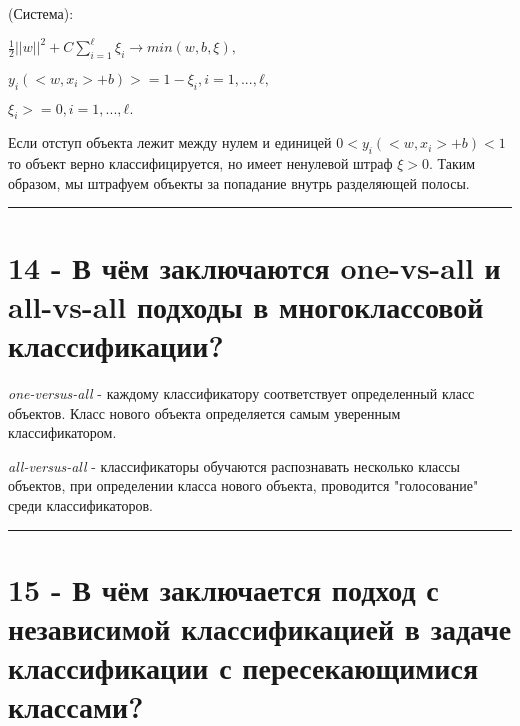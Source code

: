 \documentclass[11pt]{article}
\begin{document}
(Система):

\(\frac{1}{2}||w||^2 + C\sum_{i=1}^ℓξ_i → min(w,b,ξ) ,\)

\(y_i (<w, x_i> + b) >= 1 − ξ_i , i = 1,...,ℓ ,\)

\(ξ_i >= 0, i = 1,...,ℓ .\)

Если отступ объекта лежит между нулем и единицей
\(0 < y_i (<w, x_i> + b) < 1\) то объект верно классифицируется, но
имеет ненулевой штраф \(ξ > 0\). Таким образом, мы штрафуем объекты за
попадание внутрь разделяющей полосы.

    \begin{center}\rule{0.5\linewidth}{\linethickness}\end{center}

    \section{14 - В чём заключаются one-vs-all и all-vs-all подходы в
многоклассовой
классификации?}\label{ux432-ux447ux451ux43c-ux437ux430ux43aux43bux44eux447ux430ux44eux442ux441ux44f-one-vs-all-ux438-all-vs-all-ux43fux43eux434ux445ux43eux434ux44b-ux432-ux43cux43dux43eux433ux43eux43aux43bux430ux441ux441ux43eux432ux43eux439-ux43aux43bux430ux441ux441ux438ux444ux438ux43aux430ux446ux438ux438}

\emph{one-versus-all} - каждому классификатору соответствует
определенный класс объектов. Класс нового объекта определяется самым
уверенным классификатором.

\emph{all-versus-all} - классификаторы обучаются распознавать несколько
классы объектов, при определении класса нового объекта, проводится
"голосование" среди классификаторов.

    \begin{center}\rule{0.5\linewidth}{\linethickness}\end{center}

    \section{15 - В чём заключается подход с независимой классификацией в
задаче классификации с пересекающимися
классами?}\label{ux432-ux447ux451ux43c-ux437ux430ux43aux43bux44eux447ux430ux435ux442ux441ux44f-ux43fux43eux434ux445ux43eux434-ux441-ux43dux435ux437ux430ux432ux438ux441ux438ux43cux43eux439-ux43aux43bux430ux441ux441ux438ux444ux438ux43aux430ux446ux438ux435ux439-ux432-ux437ux430ux434ux430ux447ux435-ux43aux43bux430ux441ux441ux438ux444ux438ux43aux430ux446ux438ux438-ux441-ux43fux435ux440ux435ux441ux435ux43aux430ux44eux449ux438ux43cux438ux441ux44f-ux43aux43bux430ux441ux441ux430ux43cux438}
\end{document}

